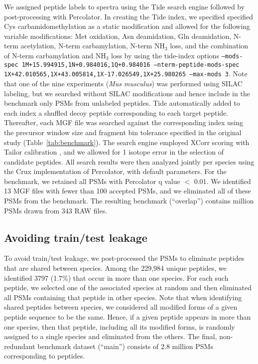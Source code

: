 \documentclass{article}
\newcommand{\fixme}[1]{{\color{red}{\bf FIXME: #1}\color{black}}}
\begin{document}
We assigned peptide labels to spectra using the Tide search engine followed by post-processing with Percolator.
In creating the Tide index, we specified specified Cys carbamidomethylation as a static modification and allowed for the following variable modifications: Met oxidation, Asn deamidation, Gln deamidation, N-term acetylation, N-term carbamylation, N-term NH$_{3}$ loss, and the combination of N-term carbamylation and NH$_{3}$ loss by using the tide-index options {\tt --mods-spec 1M+15.994915,\allowbreak 1N+0.984016,\allowbreak 1Q+0.984016 --nterm-peptide-mods-spec 1X+42.010565,\allowbreak 1X+43.005814,\allowbreak 1X-17.026549,\allowbreak 1X+25.980265 --max-mods 3}.
Note that one of the nine experiments (\textit{Mus musculus}) was performed using SILAC labeling, but we searched without SILAC modifications and hence include in the benchmark only PSMs from unlabeled peptides.
Tide automatically added to each index a shuffled decoy peptide corresponding to each target peptide.
Thereafter, each MGF file was searched against the corresponding index using the precursor window size and fragment bin tolerance specified in the original study (Table~\ref{tab:benchmark}).
The search engine employed XCorr scoring with Tailor calibration \cite{sulimov2020tailor}, and we allowed for 1 isotope error in the selection of candidate peptides.
All search results were then analyzed jointly per species using the Crux implementation of Percolator, with default parameters.
For the benchmark, we retained all PSMs with Percolator q value $<$ 0.01.
We identified 13 MGF files with fewer than 100 accepted PSMs, and we eliminated all of these PSMs from the benchmark.
The resulting benchmark (``overlap'') contains \fixme{XXX} million PSMs drawn from 343 RAW files.

\subsection*{Avoiding train/test leakage}

To avoid train/test leakage, we post-processed the PSMs to eliminate peptides that are shared between species.
Among the 229,984 unique peptides, we identified 3797 (1.7\%) that occur in more than one species.
For each such peptide, we selected one of the associated species at random and then eliminated all PSMs containing that peptide in other species.
Note that when identifying shared peptides between species, we considered all modified forms of a given peptide sequence to be the same.
Hence, if a given peptide appears in more than one species, then that peptide, including all its modified forms, is randomly assigned to a single species and eliminated from the others.
The final, non-redundant benchmark dataset (``main'') consists of 2.8 million PSMs corresponding to \fixme{XXX} peptides.
\end{document}
